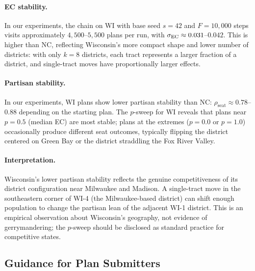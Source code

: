 \paragraph{EC stability.}
In our experiments, the \flip{} chain on WI with base seed $s = 42$ and
$F = 10{,}000$ steps visits approximately $4{,}500$--$5{,}500$ plans per
run, with $\sigma_{\mathrm{EC}} \approx 0.031$--$0.042$.
This is higher than NC, reflecting Wisconsin's more compact shape and lower
number of districts: with only $k = 8$ districts, each tract represents a
larger fraction of a district, and single-tract moves have proportionally
larger effects.

\paragraph{Partisan stability.}
In our experiments, WI plans show lower partisan stability than NC:
$\rho_{\mathrm{seat}} \approx 0.78$--$0.88$ depending on the starting plan.
The $p$-sweep for WI reveals that plans near $p = 0.5$ (median EC) are most
stable; plans at the extremes ($p = 0.0$ or $p = 1.0$) occasionally produce
different seat outcomes, typically flipping the district centered on Green Bay
or the district straddling the Fox River Valley.

\paragraph{Interpretation.}
Wisconsin's lower partisan stability reflects the genuine competitiveness of
its district configuration near Milwaukee and Madison.
A single-tract move in the southeastern corner of WI-4 (the Milwaukee-based
district) can shift enough population to change the partisan lean of the
adjacent WI-1 district.
This is an empirical observation about Wisconsin's geography, not evidence of
gerrymandering; the $p$-sweep should be disclosed as standard practice for
competitive states.

\subsection{Guidance for Plan Submitters}

